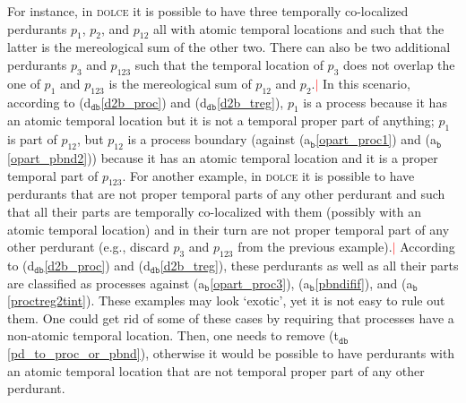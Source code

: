 \documentclass[ao]{iosart2x}
\newcommand{\nb}[1]{\textcolor{red}{$|$}\marginpar{\hspace*{-0cm}\parbox{20mm}{\scriptsize\raggedright\textcolor{red}{#1}}}}
\newcommand{\bfoAxLabel}{\textrm{a$_\texttt{b}$}}
\newcommand{\dbDefLabel}{\textrm{d$_\texttt{db}$}}
\newcommand{\dbThrLabel}{\textrm{t$_\texttt{db}$}}
\newcommand{\refbfoax}[1]{({\bfoAxLabel}\ref{#1})}
\newcommand{\refdbdf}[1]{({\dbDefLabel}\ref{#1})}
\newcommand{\refdbth}[1]{({\dbThrLabel}\ref{#1})}
\newcommand{\pr}[1]{\mathtt{#1}}
\newcommand{\dolce}{{\textsc{dolce}}}
\newcommand {\SUMd} {\ensuremath{\pr{SUM}}}
\begin{document}
For instance, in {\dolce} it is possible to have three temporally co-localized perdurants $p_1$, $p_2$, and $p_{12}$ all with atomic temporal locations and such that  the latter is the mereological sum of the other two. %
There can also be two additional perdurants $p_3$ and $p_{123}$ such that the temporal location of $p_3$ does not overlap the one of $p_1$ and $p_{123}$ is the mereological sum of $p_{12}$ and $p_{2}$.\nb{SB: questo dovrebbe essere $p_{3}$, vero?} %
 In this scenario, according to \refdbdf{d2b_proc} and \refdbdf{d2b_treg}, $p_{1}$ is a process because it has an atomic temporal location but it is not a temporal proper part of anything; $p_1$ is part of $p_{12}$, but $p_{12}$ is a process boundary  (against \refbfoax{opart_proc1} and \refbfoax{opart_pbnd2}) because it has an atomic temporal location and it is a proper temporal part of $p_{123}$. For another example, in {\dolce} it is possible to have perdurants that are not proper temporal parts of any other perdurant and such that all their parts are temporally co-localized with them (possibly with an atomic temporal location) and in their turn are not proper temporal part of any other perdurant (e.g., discard $p_3$ and $p_{123}$ from the previous example).\nb{SB: a me questo esempio non è chiaro} According to \refdbdf{d2b_proc} and \refdbdf{d2b_treg}, these perdurants as well as all their parts are classified as processes against \refbfoax{opart_proc3}, \refbfoax{pbndifif}, and \refbfoax{proctreg2tint}. These examples may look `exotic', yet it is not easy to rule out them. One could get rid of some of these cases by requiring that processes have a non-atomic temporal location. Then, one needs to remove \refdbth{pd_to_proc_or_pbnd}, otherwise it would be possible to have perdurants with an atomic temporal location that are not temporal proper part of any other perdurant. 
\end{document}
